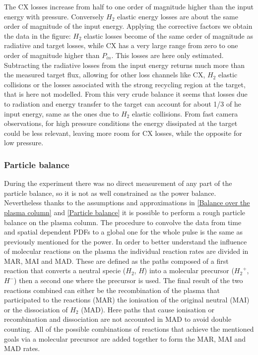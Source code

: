 The CX losses increase from half to one order of magnitude higher than the input energy with pressure. Conversely $H_2$ elastic energy losses are about the same order of magnitude of the input energy. Applying the corrective factors we obtain the data in the figure: $H_2$ elastic losses become of the same order of magnitude as radiative and target losses, while CX has a very large range from zero to one order of magnitude higher than $P_{in}$. This losses are here only estimated. Subtracting the radiative losses from the input energy returns much more than the measured target flux, allowing for other loss channels like CX, $H_2$ elastic collisions or the losses associated with the strong recycling region at the target, that is here not modelled. From this very crude balance it seems that losses due to radiation and energy transfer to the target can account for about 1/3 of he input energy, same as the ones due to $H_2$ elastic collisions. From fast camera observations, for high pressure conditions the energy dissipated at the target could be less relevant, leaving more room for CX losses, while the opposite for low pressure.

\subsubsection{Particle balance}\label{Particle balance bayesian}
During the experiment there was no direct measurement of any part of the particle balance, so it is not as well constrained as the power balance. Nevertheless thanks to the assumptions and approximations in \autoref{Balance over the plasma column} and \ref{Particle balance} it is possible to perform a rough particle balance on the plasma column. The procedure to convolve the data from time and spatial dependent PDFs to a global one for the whole pulse is the same as previously mentioned for the power. In order to better understand the influence of molecular reactions on the plasma the individual reaction rates are divided in MAR, MAI and MAD. These are defined as the paths composed of a first reaction that converts a neutral specie ($H_2$, $H$) into a molecular precursor (${H_2}^+$, $H^-$) then a second one where the precursor is used. The final result of the two reactions combined can either be the recombination of the plasma that participated to the reactions (MAR) the ionisation of the original neutral (MAI) or the dissociation of $H_2$ (MAD). Here paths that cause ionisation or recombination and dissociation are not accounted in MAD to avoid double counting. All of the possible combinations of reactions that achieve the mentioned goals via a molecular precursor are added together to form the MAR, MAI and MAD rates.\cite{Verhaegh2020} 


